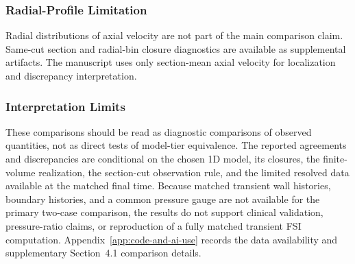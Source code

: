 \subsubsection{Radial-Profile Limitation}
\label{subsec:reconstructed-radial-profile-results}

Radial distributions of axial velocity are not part of the main comparison
claim. Same-cut section and radial-bin closure diagnostics are available as
supplemental artifacts. The manuscript uses only section-mean axial velocity for
localization and discrepancy interpretation.

\subsubsection{Interpretation Limits}
\label{subsec:spatial-localization-discrepancies}

These comparisons should be read as diagnostic comparisons of observed
quantities, not as direct tests of model-tier equivalence. The reported
agreements and discrepancies are conditional on the chosen 1D model, its
closures, the finite-volume realization, the section-cut observation rule, and
the limited resolved data available at the matched final time. Because matched
transient wall histories, boundary histories, and a common pressure gauge are
not available for the primary two-case comparison, the results do not support
clinical validation, pressure-ratio claims, or reproduction of a fully matched
transient FSI computation. Appendix~\ref{app:code-and-ai-use} records the data
availability and supplementary Section~4.1 comparison details.
